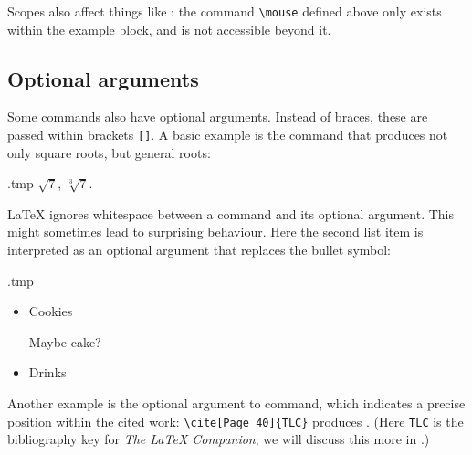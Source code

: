 Scopes also affect things like :
the command \verb|\mouse| defined above only exists
within the example block, and is not accessible beyond it.



%
\subsection{Optional arguments}

Some commands also have optional arguments.
Instead of braces, these are passed within brackets \verb|[]|.
A basic example is the  command
that produces not only square roots, but general roots:
\begin{VerbatimOut}{\jobname.tmp}
$\sqrt{7}$,
$\sqrt[3]{7}$.
\end{VerbatimOut}
\ShowExample

\begin{gotcha}
\LaTeX{} ignores whitespace between a command and its optional argument.
This might sometimes lead to surprising behaviour.
Here the second list item is interpreted as an optional argument that replaces the bullet symbol:
%
\begin{VerbatimOut}{\jobname.tmp}
\begin{itemize}
\item Cookies
\item [Maybe cake?]
\item Drinks
\end{itemize}
\end{VerbatimOut}
\ShowExample
\end{gotcha}

Another example is the optional argument to  command,
which indicates a precise position within the cited work:
\verb|\cite[Page 40]{TLC}| produces \cite[Page 40]{TLC}.
(Here \verb|TLC| is the bibliography key for \emph{The \LaTeX{} Companion};
we will discuss this more in .)

